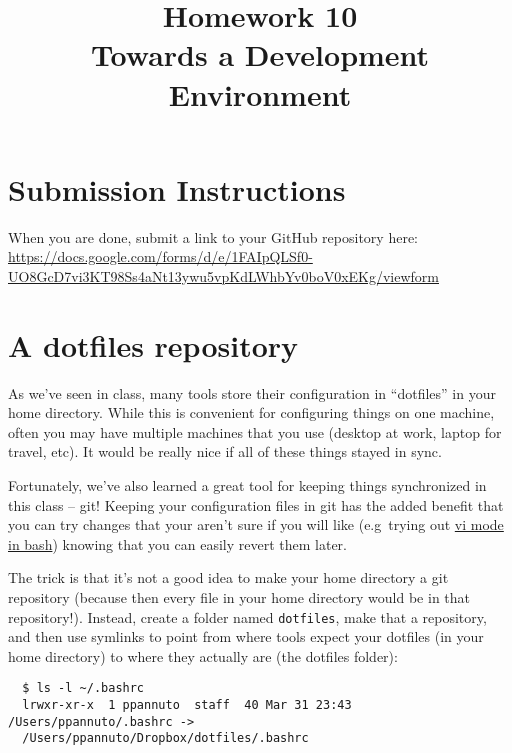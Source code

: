 \documentclass{article}
\begin{document}
\fancyfoot[C]{\color{gray} \thepage~/~\pageref*{LastPage}}
\pagestyle{fancyplain}

\title{\textbf{Homework 10\\Towards a Development Environment}}
\author{\textbf{\color{red}{Due: Wednesday, November 22nd, 11:59PM (Hard Deadline)}}}
\date{}
\maketitle


\section*{Submission Instructions}
When you are done, submit a link to your GitHub repository here: \url{https://docs.google.com/forms/d/e/1FAIpQLSf0-UO8GcD7vi3KT98Ss4aNt13ywu5vpKdLWhbYv0boV0xEKg/viewform}


\section{A dotfiles repository}

As we've seen in class, many tools store their configuration in ``dotfiles''
in your home directory. While this is convenient for configuring things on one
machine, often you may have multiple machines that you use (desktop at
work, laptop for travel, etc). It would be really nice if all of these things
stayed in sync.

Fortunately, we've also learned a great tool for keeping things synchronized
in this class -- git! Keeping your configuration files in git has the added
benefit that you can try changes that your aren't sure if you will like
(e.g\ trying out \href{http://blog.sanctum.geek.nz/vi-mode-in-bash/}{vi mode
in bash}) knowing that you can easily revert them later.

The trick is that it's not a good idea to make your home directory a git
repository (because then every file in your home directory would be in that
repository!). Instead, create a folder named \texttt{dotfiles}, make that a
repository, and then use symlinks to point from where tools expect your
dotfiles (in your home directory) to where they actually are (the dotfiles
folder):

\begin{lstlisting}
  $ ls -l ~/.bashrc
  lrwxr-xr-x  1 ppannuto  staff  40 Mar 31 23:43 /Users/ppannuto/.bashrc ->
  /Users/ppannuto/Dropbox/dotfiles/.bashrc
\end{lstlisting}
\end{document}
